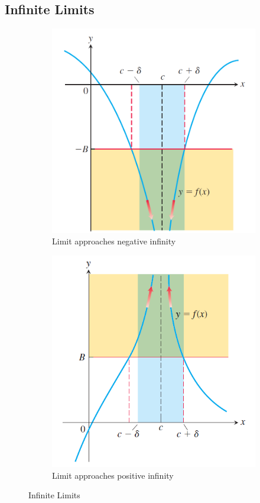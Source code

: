 \documentclass[12pt]{article}
\begin{document}
\subsection{Infinite Limits}
\begin{figure}[h!]
    \begin{subfigure}{.5\linewidth}
        \centering
        \includegraphics[width=0.9\linewidth]{Images/infty limit 2.png}
        \caption{Limit approaches negative infinity}
    \end{subfigure}
    \begin{subfigure}{0.5\linewidth}
        \centering
        \includegraphics[width=0.9\linewidth]{Images/infty limit 3.png}
        \caption{Limit approaches positive infinity}
    \end{subfigure}
    \caption{Infinite Limits}
\end{figure} 
\end{document}

